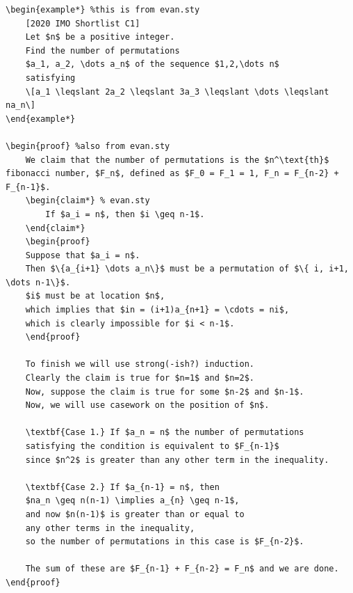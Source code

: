\documentclass[a4paper]{scrartcl}
\begin{document}
\begin{lstlisting}
\begin{example*} %this is from evan.sty
	[2020 IMO Shortlist C1]
	Let $n$ be a positive integer. 
	Find the number of permutations 
	$a_1, a_2, \dots a_n$ of the sequence $1,2,\dots n$ 
	satisfying 
	\[a_1 \leqslant 2a_2 \leqslant 3a_3 \leqslant \dots \leqslant na_n\]
\end{example*}

\begin{proof} %also from evan.sty
	We claim that the number of permutations is the $n^\text{th}$ fibonacci number, $F_n$, defined as $F_0 = F_1 = 1, F_n = F_{n-2} + F_{n-1}$.
	\begin{claim*} % evan.sty
		If $a_i = n$, then $i \geq n-1$.
	\end{claim*}
	\begin{proof}
	Suppose that $a_i = n$. 
	Then $\{a_{i+1} \dots a_n\}$ must be a permutation of $\{ i, i+1, \dots n-1\}$.
	$i$ must be at location $n$,
	which implies that $in = (i+1)a_{n+1} = \cdots = ni$, 
	which is clearly impossible for $i < n-1$.
	\end{proof}

	To finish we will use strong(-ish?) induction.
	Clearly the claim is true for $n=1$ and $n=2$.
	Now, suppose the claim is true for some $n-2$ and $n-1$.
	Now, we will use casework on the position of $n$.

	\textbf{Case 1.} If $a_n = n$ the number of permutations 
	satisfying the condition is equivalent to $F_{n-1}$ 
	since $n^2$ is greater than any other term in the inequality.

	\textbf{Case 2.} If $a_{n-1} = n$, then 
	$na_n \geq n(n-1) \implies a_{n} \geq n-1$, 
	and now $n(n-1)$ is greater than or equal to 
	any other terms in the inequality, 
	so the number of permutations in this case is $F_{n-2}$.

	The sum of these are $F_{n-1} + F_{n-2} = F_n$ and we are done.
\end{proof}
\end{lstlisting}
\end{document}

